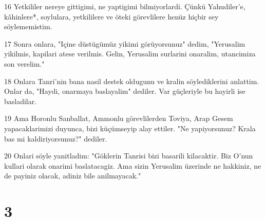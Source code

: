 \par 16 Yetkililer nereye gittigimi, ne yaptigimi bilmiyorlardi. Çünkü Yahudiler'e, kâhinlere*, soylulara, yetkililere ve öteki görevlilere henüz hiçbir sey söylememistim.
\par 17 Sonra onlara, "Içine düstügümüz yikimi görüyorsunuz" dedim, "Yerusalim yikilmis, kapilari atese verilmis. Gelin, Yerusalim surlarini onaralim, utancimiza son verelim."
\par 18 Onlara Tanri'nin bana nasil destek oldugunu ve kralin söylediklerini anlattim. Onlar da, "Haydi, onarmaya baslayalim" dediler. Var güçleriyle bu hayirli ise basladilar.
\par 19 Ama Horonlu Sanballat, Ammonlu görevlilerden Toviya, Arap Gesem yapacaklarimizi duyunca, bizi küçümseyip alay ettiler. "Ne yapiyorsunuz? Krala bas mi kaldiriyorsunuz?" dediler.
\par 20 Onlari söyle yanitladim: "Göklerin Tanrisi bizi basarili kilacaktir. Biz O'nun kullari olarak onarimi baslatacagiz. Ama sizin Yerusalim üzerinde ne hakkiniz, ne de payiniz olacak, adiniz bile anilmayacak."

\chapter{3}

